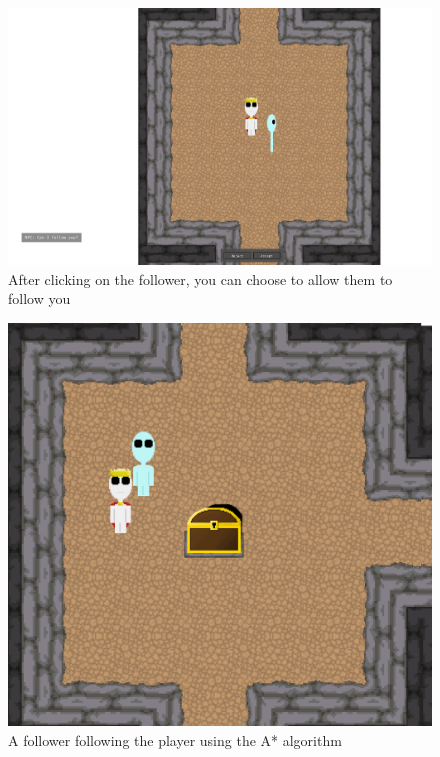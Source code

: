 \documentclass[../Main.tex]{subfiles}
\begin{document}
            \begin{figure}[hbt!]
                \centerline{\includegraphics[scale=0.4]{img/Testing/Objective/FollowerQuestion.png}}
                \caption{After clicking on the follower, you can choose to allow them to follow you}
                \label{fig:FollowerQuestion}
            \end{figure}
            \begin{figure}[hbt!]
                \centerline{\includegraphics[scale=0.4]{img/Testing/Objective/FollowerFollowing.png}}
                \caption{A follower following the player using the A* algorithm}
                \label{fig:FollowerFollowing}
            \end{figure}
\end{document}
